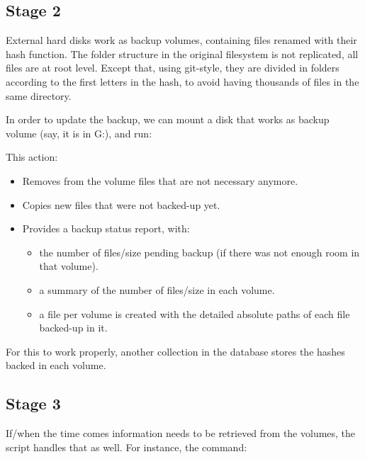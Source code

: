 \documentclass[letterpaper,10pt,english]{sphinxmanual}
\begin{document}
\subsection{Stage 2}
\label{\detokenize{index:stage-2}}
External hard disks work as backup volumes, containing files renamed with their hash function. The folder structure in the original filesystem
is not replicated, all files are at root level. Except that, using git-style, they are divided in folders according to the first
letters in the hash, to avoid having thousands of files in the same directory.

In order to update the backup, we can mount a disk that works as backup volume (say, it is in G:), and run:

\begin{sphinxVerbatim}[commandchars=\\\{\}]
   
\end{sphinxVerbatim}

This action:
\begin{itemize}
\item {} 
Removes from the volume files that are not necessary anymore.

\item {} 
Copies new files that were not backed-up yet.

\item {} 
Provides a backup status report, with:
\begin{itemize}
\item {} 
the number of files/size pending backup (if there was not enough room in that volume).

\item {} 
a summary of the number of files/size in each volume.

\item {} 
a file per volume is created with the detailed absolute paths of each file backed-up in it.

\end{itemize}

\end{itemize}

For this to work properly, another collection in the database stores the hashes backed in each volume.


\subsection{Stage 3}
\label{\detokenize{index:stage-3}}
If/when the time comes information needs to be retrieved from the volumes, the script handles that as well. For instance, the command:
\end{document}
